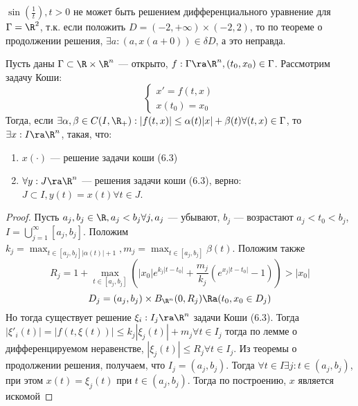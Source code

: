 \begin{example}
    \(\sin\left( \frac{1}{t} \right), t > 0\) не может быть решением дифференциального уравнение для \(\Gamma = \R^2\), т.к. если положить \(D = (-2, +\infty) \times (-2, 2)\), то по теореме о продолжении решения, \(\exists a: (a, x(a + 0)) \in \delta D\), а это неправда.
\end{example}

\begin{theorem}
    Пусть даны \(\Gamma \subset \R \times \R^n\) --- открыто, \(f: \Gamma \ra \R^n, (t_0, x_0) \in \Gamma\). Рассмотрим задачу Коши:
    \begin{equation}
        \begin{cases}
            x' = f(t, x) \\
            x(t_0) = x_0
        \end{cases}
    \end{equation}
    Тогда, если \(\exists \alpha, \beta \in C(I, \R_+): |f(t, x)| \le \alpha(t)|x| + \beta(t) \forall (t, x) \in \Gamma\), то \(\exists x: I \ra \R^n\), такая, что:
    \begin{enumerate}
        \item \(x(\cdot)\) --- решение задачи коши (6.3)
        \item \(\forall y: J \ra \R^n\) --- решения задачи коши (6.3), верно: \(J \subset I, y(t) = x(t) \forall t \in J\).
    \end{enumerate}
\end{theorem}
\begin{proof}
    Пусть \(a_j, b_j \in \R, a_j < b_j \forall j, a_j\) --- убывают, \(b_j\) --- возрастают \(a_j < t_0 < b_j\), \(I = \bigcup_{j = 1}^\infty [a_j, b_j]\). Положим \(k_j = \max_{t \in [a_j, b_j] |\alpha(t)| + 1}, m_j = \max_{t \in [a_j, b_j]} \beta(t)\). Положим также
    \[R_j = 1 + \max_{t \in [a_j, b_j]}\left( |x_0|e^{k_j|t - t_0|} + \frac{m_j}{k_j}\left( e^{x_j|t - t_0|} - 1 \right) \right) > |x_0|\]
    \[D_j = (a_j, b_j) \times B_{\R^n}(0, R_j) \Ra (t_0, x_0 \in D_j)\]
    Но тогда существует решение \(\xi_i: I_j \ra \R^n\) задачи Коши (6.3). Тогда \(|\xi'_i(t)| = |f(t, \xi(t))| \le k_j|\xi_j(t)| + m_j \forall t \in I_j\) тогда по лемме о дифференцируемом неравенстве, \(|\xi_j(t)| \le R_j \forall t \in I_j\). Из теоремы о продолжении решения, получаем, что \(I_j = (a_j, b_j)\). Тогда \(\forall t \in I \exists j: t \in (a_j, b_j)\), при этом \(x(t) = \xi_j(t)\) при \(t \in (a_j, b_j)\). Тогда по построению, \(x\) является искомой
\end{proof}

